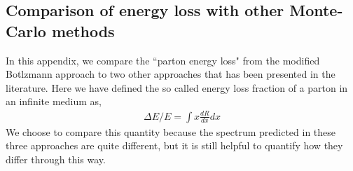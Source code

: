 \documentclass[aps, prc, reprint, amsmath, groupedaddress, nofootinbib]{revtex4-1}
\begin{document}
\begin{appendices}
\section{Comparison of energy loss with other Monte-Carlo methods}
\label{app:tune-spectrum}
In this appendix, we compare the ``parton energy loss" from the modified Botlzmann approach to two other approaches that has been presented in the literature.
Here we have defined the so called energy loss fraction of a parton in an infinite medium as,
\begin{eqnarray}
\Delta E/E = \int x \frac{dR}{dx} dx
\end{eqnarray}
We choose to compare this quantity because the spectrum predicted in these three approaches are quite different, but it is still helpful to quantify how they differ through this way.


\end{appendices}
\end{document}
